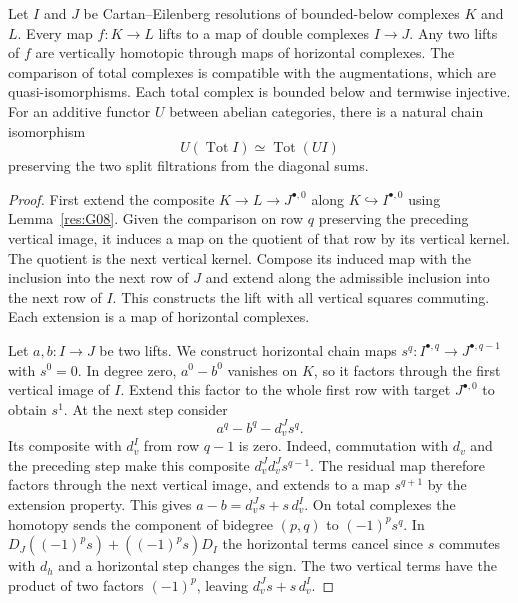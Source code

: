 \begin{theorem}
\label{res:G02}
Let \(I\) and \(J\) be Cartan--Eilenberg resolutions of bounded-below
complexes \(K\) and \(L\). Every map \(f:K\to L\) lifts to a map
of double complexes \(I\to J\). Any two lifts of \(f\) are
vertically homotopic through maps of horizontal complexes.
The comparison of total complexes is compatible with the
augmentations, which are quasi-isomorphisms. Each total complex is
bounded below and termwise injective. For an additive functor \(U\)
between abelian categories, there is a natural chain isomorphism
\[
        U(\operatorname{Tot}I)\simeq\operatorname{Tot}(U I)
\]
preserving the two split filtrations from the diagonal sums.
\end{theorem}

\begin{proof}
First extend the composite \(K\to L\to J^{\bullet,0}\)
along \(K\hookrightarrow I^{\bullet,0}\) using
Lemma~\ref{res:G08}. Given the comparison
on row \(q\) preserving the preceding vertical image, it induces
a map on the quotient of that row by its vertical kernel. The
quotient is the next vertical kernel. Compose its induced map
with the inclusion into the next row of \(J\) and extend along
the admissible inclusion into the next row of \(I\). This constructs
the lift with all vertical squares commuting. Each extension is
a map of horizontal complexes.

Let \(a,b:I\to J\) be two lifts. We construct horizontal chain
maps \(s^q:I^{\bullet,q}\to J^{\bullet,q-1}\) with \(s^0=0\).
In degree zero, \(a^0-b^0\) vanishes on \(K\), so it factors
through the first vertical image of \(I\). Extend this factor to
the whole first row with target \(J^{\bullet,0}\) to obtain \(s^1\).
At the next step consider
\[
      a^q-b^q-d_v^J s^q .
\]
Its composite with \(d_v^I\) from row \(q-1\) is zero. Indeed,
commutation with \(d_v\) and the preceding step make this
composite \(d_v^Jd_v^J s^{q-1}\). The residual map therefore
factors through the next vertical image, and extends to a map
\(s^{q+1}\) by the extension property. This gives
\(a-b=d_v^J s+s\,d_v^I\). On total complexes the homotopy sends
the component of bidegree \((p,q)\) to \((-1)^p s^q\).
In \(D_J((-1)^p s)+((-1)^p s)D_I\) the horizontal terms cancel
since \(s\) commutes with \(d_h\) and a horizontal step changes
the sign. The two vertical terms have the product of two
factors \((-1)^p\), leaving \(d_v^J s+s\,d_v^I\).


\end{proof}
